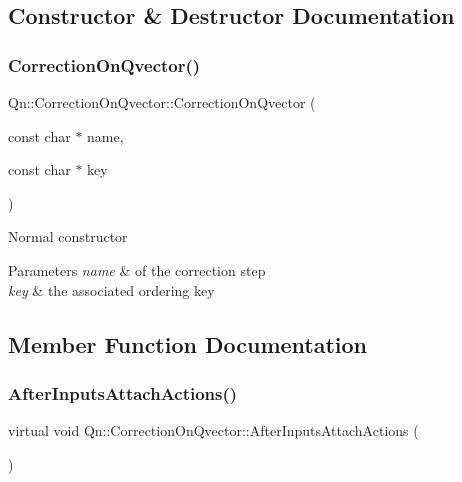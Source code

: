 \subsection{Constructor \& Destructor Documentation}
\mbox{\label{classQn_1_1CorrectionOnQvector_af5c630667adbbd37bc6ca51445a8d37f}} 
\subsubsection{\texorpdfstring{Correction\+On\+Qvector()}{CorrectionOnQvector()}}
{\footnotesize\ttfamily Qn\+::\+Correction\+On\+Qvector\+::\+Correction\+On\+Qvector (\begin{DoxyParamCaption}\item[{const char $\ast$}]{name,  }\item[{const char $\ast$}]{key }\end{DoxyParamCaption})}

Normal constructor 
\begin{DoxyParams}{Parameters}
{\em name} & of the correction step \\
\hline
{\em key} & the associated ordering key \\
\hline
\end{DoxyParams}


\subsection{Member Function Documentation}
\mbox{\label{classQn_1_1CorrectionOnQvector_afa95ec7804ade8097d92002e0ea05e44}} 
\subsubsection{\texorpdfstring{After\+Inputs\+Attach\+Actions()}{AfterInputsAttachActions()}}
{\footnotesize\ttfamily virtual void Qn\+::\+Correction\+On\+Qvector\+::\+After\+Inputs\+Attach\+Actions (\begin{DoxyParamCaption}{ }\end{DoxyParamCaption})\hspace{0.3cm}{\ttfamily [pure virtual]}}

